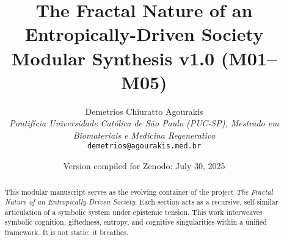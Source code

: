\documentclass[12pt]{article}
\title{\textbf{The Fractal Nature of an Entropically-Driven Society} \\ \large Modular Synthesis v1.0 (M01–M05)}
\author{
Demetrios Chiuratto Agourakis\\
\textit{Pontifícia Universidade Católica de São Paulo (PUC-SP), Mestrado em Biomateriais e Medicina Regenerativa}\\
\texttt{demetrios@agourakis.med.br}
}
\date{Version compiled for Zenodo: July 30, 2025}
\begin{document}
\maketitle


\begin{abstract}
This modular manuscript serves as the evolving container of the project \textit{The Fractal Nature of an Entropically-Driven Society}. Each section acts as a recursive, self-similar articulation of a symbolic system under epistemic tension. This work interweaves symbolic cognition, giftedness, entropy, and cognitive singularities within a unified framework. It is not static: it breathes.
\end{abstract}

\tableofcontents
\newpage




 
 
% 
% 
% 
% 




\end{document}
